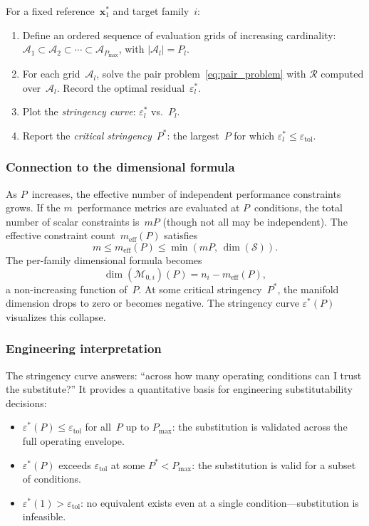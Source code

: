 For a fixed reference~$\mathbf{x}_1^*$ and target family~$i$:
\begin{enumerate}
    \item Define an ordered sequence of evaluation grids of increasing cardinality: $\mathcal{A}_1 \subset \mathcal{A}_2 \subset \cdots \subset \mathcal{A}_{P_{\max}}$, with $|\mathcal{A}_l| = P_l$.
    \item For each grid~$\mathcal{A}_l$, solve the pair problem~\eqref{eq:pair_problem} with $\mathcal{R}$ computed over~$\mathcal{A}_l$. Record the optimal residual~$\varepsilon_l^*$.
    \item Plot the \emph{stringency curve}: $\varepsilon_l^*$ vs.\ $P_l$.
    \item Report the \emph{critical stringency}~$P^*$: the largest~$P$ for which $\varepsilon_l^* \leq \varepsilon_{\mathrm{tol}}$.
\end{enumerate}

\subsubsection{Connection to the dimensional formula}

As $P$~increases, the effective number of independent performance constraints grows. If the $m$~performance metrics are evaluated at $P$~conditions, the total number of scalar constraints is~$mP$ (though not all may be independent). The effective constraint count~$m_{\mathrm{eff}}(P)$ satisfies
\begin{equation}
    m \leq m_{\mathrm{eff}}(P) \leq \min(mP,\, \dim(\mathcal{S})).
    \label{eq:m_eff}
\end{equation}
The per-family dimensional formula becomes
\begin{equation}
    \dim(\mathcal{M}_{0,i})(P) = n_i - m_{\mathrm{eff}}(P),
    \label{eq:dim_vs_P}
\end{equation}
a non-increasing function of~$P$. At some critical stringency~$P^*$, the manifold dimension drops to zero or becomes negative. The stringency curve $\varepsilon^*(P)$ visualizes this collapse.

\subsubsection{Engineering interpretation}

The stringency curve answers: ``across how many operating conditions can I trust the substitute?'' It provides a quantitative basis for engineering substitutability decisions:
\begin{itemize}
    \item $\varepsilon^*(P) \leq \varepsilon_{\mathrm{tol}}$ for all~$P$ up to $P_{\max}$: the substitution is validated across the full operating envelope.
    \item $\varepsilon^*(P)$ exceeds $\varepsilon_{\mathrm{tol}}$ at some $P^* < P_{\max}$: the substitution is valid for a subset of conditions.
    \item $\varepsilon^*(1) > \varepsilon_{\mathrm{tol}}$: no equivalent exists even at a single condition---substitution is infeasible.
\end{itemize}


